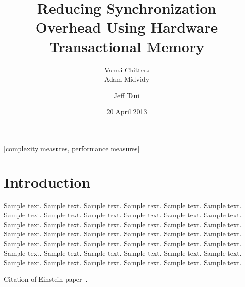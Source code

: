 \documentclass{acm_proc_article-sp}
\begin{document}
\newcommand{\tab}{\hspace*{2em}}

\title{Reducing Synchronization Overhead Using Hardware Transactional Memory}

\author{
\alignauthor
Vamsi Chitters\\
\alignauthor
Adam Midvidy\\
\and %
\alignauthor
Jeff Tsui\\
}

\date{20 April 2013}


\maketitle
\begin{abstract}
 
\end{abstract}

[complexity measures, performance measures]



\section*{Introduction}
Sample text. Sample text. Sample text. Sample text. Sample text. Sample text. 
Sample text. Sample text. Sample text. Sample text. Sample text. Sample text. 
Sample text. Sample text. Sample text. Sample text. Sample text. Sample text. 
Sample text. Sample text. Sample text. Sample text. Sample text. Sample text. 
Sample text. Sample text. Sample text. Sample text. Sample text. Sample text. 
Sample text. Sample text. Sample text. Sample text. Sample text. Sample text. 
Sample text. Sample text. Sample text. Sample text. Sample text. Sample text. 

Citation of Einstein paper~\cite{Einstein}.
\end{document}

